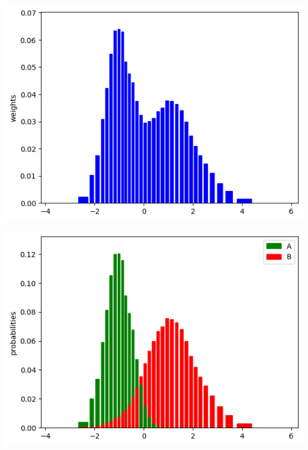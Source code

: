 \begin{toReview}
\begin{exempli_gratia}
	\begin{center}
		\begin{minipage}{0.48\textwidth}
			\centering
			\includegraphics[width=\textwidth]{Figures/fused_analysis.png}
		\end{minipage}
		\hfill
		\begin{minipage}{0.48\textwidth}
			\centering
			\includegraphics[width=\textwidth]{Figures/separated_analysis.png}
		\end{minipage}
	\end{center}

\end{exempli_gratia}


\end{toReview}

